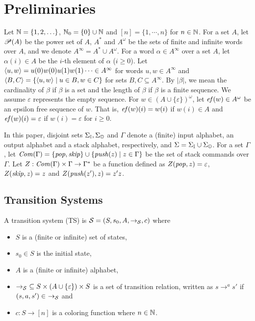 \section{Preliminaries}
Let $\mathbb{N}=\{1,2,\ldots\}$, $\mathbb{N}_0=\{0\} \cup \mathbb{N}$ and $[n]=\{1,\cdots,n\}$ for $n\in\mathbb{N}$.
For a set $A$, let $\mathscr{P}(A)$ be the power set of $A$,
$A^*$ and $A^\omega$ be the sets of finite and infinite words over $A$,
and we denote $A^\infty = A^* \cup A^\omega$.
For a word $\alpha\in A^\infty$ over a set $A$,
let $\alpha(i)\in A$ be the $i$-th element of $\alpha$ ($i\geq 0$).
Let $\langle u, w\rangle = u(0)w(0)u(1)w(1)\cdots \in A^\infty$ for words $u,w\in A^\infty$ and $\langle B, C\rangle = \{\langle u, w\rangle\mid u\in B, w\in C\}$ for sets $B, C\subseteq A^\infty$.
By $|\beta|$, we mean the cardinality of $\beta$ if $\beta$ is a set
and the length of $\beta$ if $\beta$ is a finite sequence.
We assume $\varepsilon$ represents the empty sequence.
For $w\in (A\cup\{\varepsilon\})^\omega$, let
$\mathit{ef}(w)\in A^\omega$ be an epsilon free sequence of $w$.
That is, $\mathit{ef}(w)(i) = w(i)$ if $w(i)\in A$ and $\mathit{ef}(w)(i)=\varepsilon$ if $w(i)=\varepsilon$ for $i\geq 0$.

In this paper, disjoint sets $\Sigma_{\mathbb{I}}, \Sigma_{\mathbb{O}}$ and $\Gamma$ denote
a (finite) input alphabet, an output alphabet and a stack alphabet, respectively,
and $\Sigma = \Sigma_{\mathbb{I}} \cup \Sigma_{\mathbb{O}}$.
For a set $\Gamma$, let $\mathit{Com}(\Gamma) = \{\mathit{pop},\mathit{skip}\}\cup\{\mathit{push}(z)\mid z\in \Gamma\}$ be the set of stack commands over $\Gamma$.
Let $Z:\mathit{Com}(\Gamma)\times \Gamma \to \Gamma^*$ be a function defined as $Z(\mathit{pop},z)=\varepsilon$, $Z(\mathit{skip},z)=z$ and $Z(\mathit{push}(z'),z)=z'z$.

\subsection{Transition Systems}
\begin{definition}
A {transition system} (TS)
is ${\cal S}=(S, s_0, A, \to_{\cal S}, c)$ where
\begin{itemize}
\item $S$ is a (finite or infinite) set of states,
\item $s_0\in S$ is the initial state,
\item $A$ is a (finite or infinite) alphabet,
\item $\to_{\cal S}\ \subseteq S\times(A\cup\{\varepsilon\})\times S$ is a set of transition relation, written as $s\to^a s'$ if $(s,a,s')\in\ \to_{\cal S}$ and
\item $c: S \to [n]$ is a coloring function where $n\in \mathbb{N}$.
\end{itemize}
\end{definition}


